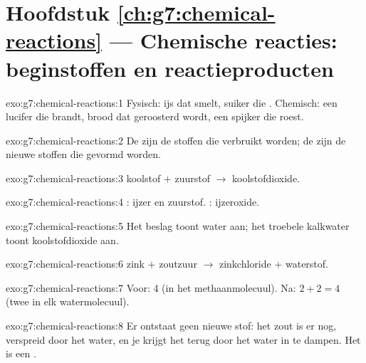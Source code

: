 \section*{Hoofdstuk \ref{ch:g7:chemical-reactions} --- Chemische reacties: beginstoffen en reactieproducten}

\begin{solution}{exo:g7:chemical-reactions:1}
Fysisch: ijs dat smelt, suiker die . Chemisch: een lucifer die
brandt, brood dat geroosterd wordt, een spijker die roest.
\end{solution}

\begin{solution}{exo:g7:chemical-reactions:2}
De  zijn de stoffen die verbruikt worden; de
 zijn de nieuwe stoffen die gevormd worden.
\end{solution}

\begin{solution}{exo:g7:chemical-reactions:3}
koolstof $+$ zuurstof $\longrightarrow$ koolstofdioxide.
\end{solution}

\begin{solution}{exo:g7:chemical-reactions:4}
: ijzer en zuurstof. : ijzeroxide.
\end{solution}

\begin{solution}{exo:g7:chemical-reactions:5}
Het beslag toont water aan; het troebele kalkwater toont koolstofdioxide
aan.
\end{solution}

\begin{solution}{exo:g7:chemical-reactions:6}
zink $+$ zoutzuur $\longrightarrow$ zinkchloride $+$ waterstof.
\end{solution}

\begin{solution}{exo:g7:chemical-reactions:7}
Voor: 4 (in het methaanmolecuul). Na: $2 + 2 = 4$ (twee in elk
watermolecuul).
\end{solution}

\begin{solution}{exo:g7:chemical-reactions:8}
Er ontstaat geen nieuwe stof: het zout is er nog, verspreid door het
water, en je krijgt het terug door het water in te dampen. Het is een
.
\end{solution}


